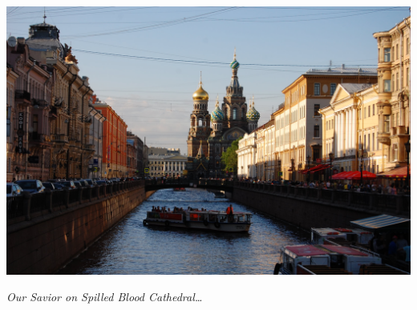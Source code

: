 \documentclass[10pt,a4paper]{article} %
\begin{document}
\begin{center}
\vspace{10pt}
\includegraphics[width=0.8\linewidth]{media/main_picture.jpg} %
\par\large\textit{Our Savior on Spilled Blood Cathedral\ldots}
\vspace{10pt}
\end{center}
\end{document}
